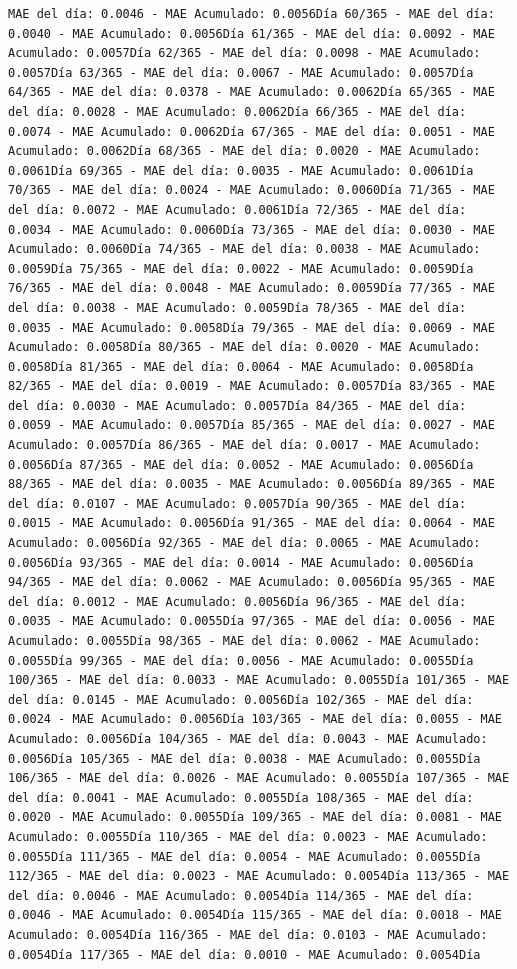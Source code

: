 \documentclass[
]{book}
\begin{document}
\begin{verbatim}
MAE del día: 0.0046 - MAE Acumulado: 0.0056Día 60/365 - MAE del día: 0.0040 - MAE Acumulado: 0.0056Día 61/365 - MAE del día: 0.0092 - MAE Acumulado: 0.0057Día 62/365 - MAE del día: 0.0098 - MAE Acumulado: 0.0057Día 63/365 - MAE del día: 0.0067 - MAE Acumulado: 0.0057Día 64/365 - MAE del día: 0.0378 - MAE Acumulado: 0.0062Día 65/365 - MAE del día: 0.0028 - MAE Acumulado: 0.0062Día 66/365 - MAE del día: 0.0074 - MAE Acumulado: 0.0062Día 67/365 - MAE del día: 0.0051 - MAE Acumulado: 0.0062Día 68/365 - MAE del día: 0.0020 - MAE Acumulado: 0.0061Día 69/365 - MAE del día: 0.0035 - MAE Acumulado: 0.0061Día 70/365 - MAE del día: 0.0024 - MAE Acumulado: 0.0060Día 71/365 - MAE del día: 0.0072 - MAE Acumulado: 0.0061Día 72/365 - MAE del día: 0.0034 - MAE Acumulado: 0.0060Día 73/365 - MAE del día: 0.0030 - MAE Acumulado: 0.0060Día 74/365 - MAE del día: 0.0038 - MAE Acumulado: 0.0059Día 75/365 - MAE del día: 0.0022 - MAE Acumulado: 0.0059Día 76/365 - MAE del día: 0.0048 - MAE Acumulado: 0.0059Día 77/365 - MAE del día: 0.0038 - MAE Acumulado: 0.0059Día 78/365 - MAE del día: 0.0035 - MAE Acumulado: 0.0058Día 79/365 - MAE del día: 0.0069 - MAE Acumulado: 0.0058Día 80/365 - MAE del día: 0.0020 - MAE Acumulado: 0.0058Día 81/365 - MAE del día: 0.0064 - MAE Acumulado: 0.0058Día 82/365 - MAE del día: 0.0019 - MAE Acumulado: 0.0057Día 83/365 - MAE del día: 0.0030 - MAE Acumulado: 0.0057Día 84/365 - MAE del día: 0.0059 - MAE Acumulado: 0.0057Día 85/365 - MAE del día: 0.0027 - MAE Acumulado: 0.0057Día 86/365 - MAE del día: 0.0017 - MAE Acumulado: 0.0056Día 87/365 - MAE del día: 0.0052 - MAE Acumulado: 0.0056Día 88/365 - MAE del día: 0.0035 - MAE Acumulado: 0.0056Día 89/365 - MAE del día: 0.0107 - MAE Acumulado: 0.0057Día 90/365 - MAE del día: 0.0015 - MAE Acumulado: 0.0056Día 91/365 - MAE del día: 0.0064 - MAE Acumulado: 0.0056Día 92/365 - MAE del día: 0.0065 - MAE Acumulado: 0.0056Día 93/365 - MAE del día: 0.0014 - MAE Acumulado: 0.0056Día 94/365 - MAE del día: 0.0062 - MAE Acumulado: 0.0056Día 95/365 - MAE del día: 0.0012 - MAE Acumulado: 0.0056Día 96/365 - MAE del día: 0.0035 - MAE Acumulado: 0.0055Día 97/365 - MAE del día: 0.0056 - MAE Acumulado: 0.0055Día 98/365 - MAE del día: 0.0062 - MAE Acumulado: 0.0055Día 99/365 - MAE del día: 0.0056 - MAE Acumulado: 0.0055Día 100/365 - MAE del día: 0.0033 - MAE Acumulado: 0.0055Día 101/365 - MAE del día: 0.0145 - MAE Acumulado: 0.0056Día 102/365 - MAE del día: 0.0024 - MAE Acumulado: 0.0056Día 103/365 - MAE del día: 0.0055 - MAE Acumulado: 0.0056Día 104/365 - MAE del día: 0.0043 - MAE Acumulado: 0.0056Día 105/365 - MAE del día: 0.0038 - MAE Acumulado: 0.0055Día 106/365 - MAE del día: 0.0026 - MAE Acumulado: 0.0055Día 107/365 - MAE del día: 0.0041 - MAE Acumulado: 0.0055Día 108/365 - MAE del día: 0.0020 - MAE Acumulado: 0.0055Día 109/365 - MAE del día: 0.0081 - MAE Acumulado: 0.0055Día 110/365 - MAE del día: 0.0023 - MAE Acumulado: 0.0055Día 111/365 - MAE del día: 0.0054 - MAE Acumulado: 0.0055Día 112/365 - MAE del día: 0.0023 - MAE Acumulado: 0.0054Día 113/365 - MAE del día: 0.0046 - MAE Acumulado: 0.0054Día 114/365 - MAE del día: 0.0046 - MAE Acumulado: 0.0054Día 115/365 - MAE del día: 0.0018 - MAE Acumulado: 0.0054Día 116/365 - MAE del día: 0.0103 - MAE Acumulado: 0.0054Día 117/365 - MAE del día: 0.0010 - MAE Acumulado: 0.0054Día 
\end{verbatim}
\end{document}
